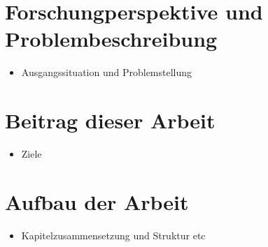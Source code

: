 \section{Forschungperspektive und Problembeschreibung}
\begin{itemize}
    \item {Ausgangssituation und Problemstellung}
\end{itemize}

\section{Beitrag dieser Arbeit}
\begin{itemize}
    \item {Ziele}
\end{itemize}

\section{Aufbau der Arbeit}
\begin{itemize}
    \item {Kapitelzusammensetzung und Struktur etc}
\end{itemize}